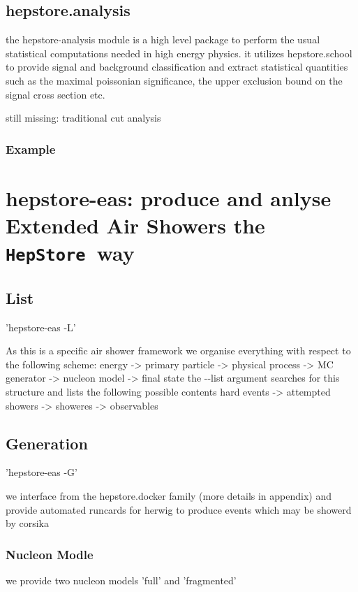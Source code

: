 \documentclass[aps,prd,11pt,tightenlines,superscriptaddress,nofootinbib,preprintnumbers,notitlepage]{revtex4-1}
\newcommand{\hepstore}{\texttt{HepStore}}
\begin{document}
\subsection{hepstore.analysis}

the hepstore-analysis module is a high level package to perform the usual statistical computations needed in high energy physics. it utilizes hepstore.school to provide signal and background classification and extract statistical quantities such as the maximal poissonian significance, the upper exclusion bound on the signal cross section etc.

still missing: traditional cut analysis

\subsubsection{Example}

\section{hepstore-eas: produce and anlyse Extended Air Showers the \hepstore~way}

\subsection{List}
'hepstore-eas -L'

As this is a specific air shower framework we organise everything with respect to the following scheme: energy -> primary particle -> physical process -> MC generator -> nucleon model -> final state
the -{}-list argument searches for this structure and lists the following possible contents
hard events -> attempted showers -> showeres -> observables

\subsection{Generation}

'hepstore-eas -G'

we interface from the hepstore.docker family (more details in appendix) and provide automated runcards for herwig to produce events which may be showerd by corsika

\subsubsection{Nucleon Modle}

we provide two nucleon models 'full' and 'fragmented'
\end{document}
